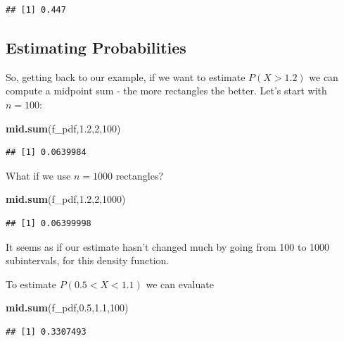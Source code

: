 \documentclass[
]{book}
\newenvironment{Shaded}{\begin{snugshade}}{\end{snugshade}}
\newcommand{\DecValTok}[1]{\textcolor[rgb]{0.00,0.00,0.81}{#1}}
\newcommand{\FloatTok}[1]{\textcolor[rgb]{0.00,0.00,0.81}{#1}}
\newcommand{\FunctionTok}[1]{\textcolor[rgb]{0.13,0.29,0.53}{\textbf{#1}}}
\newcommand{\NormalTok}[1]{#1}
\theoremstyle{definition}
\theoremstyle{definition}
\theoremstyle{definition}
\theoremstyle{definition}
\theoremstyle{remark}
\begin{document}
\begin{verbatim}
## [1] 0.447
\end{verbatim}

\subsection{Estimating Probabilities}\label{estimating-probabilities}

So, getting back to our example, if we want to estimate \(P(X > 1.2)\) we can compute a midpoint sum - the more rectangles the better. Let's start with \(n = 100\):

\begin{Shaded}
\begin{Highlighting}[]
\FunctionTok{mid.sum}\NormalTok{(f\_pdf,}\FloatTok{1.2}\NormalTok{,}\DecValTok{2}\NormalTok{,}\DecValTok{100}\NormalTok{)}
\end{Highlighting}
\end{Shaded}

\begin{verbatim}
## [1] 0.0639984
\end{verbatim}

What if we use \(n = 1000\) rectangles?

\begin{Shaded}
\begin{Highlighting}[]
\FunctionTok{mid.sum}\NormalTok{(f\_pdf,}\FloatTok{1.2}\NormalTok{,}\DecValTok{2}\NormalTok{,}\DecValTok{1000}\NormalTok{)}
\end{Highlighting}
\end{Shaded}

\begin{verbatim}
## [1] 0.06399998
\end{verbatim}

It seems as if our estimate hasn't changed much by going from 100 to 1000 subintervals, for this density function.

To estimate \(P(0.5 < X < 1.1)\) we can evaluate

\begin{Shaded}
\begin{Highlighting}[]
\FunctionTok{mid.sum}\NormalTok{(f\_pdf,}\FloatTok{0.5}\NormalTok{,}\FloatTok{1.1}\NormalTok{,}\DecValTok{100}\NormalTok{)}
\end{Highlighting}
\end{Shaded}

\begin{verbatim}
## [1] 0.3307493
\end{verbatim}
\end{document}
